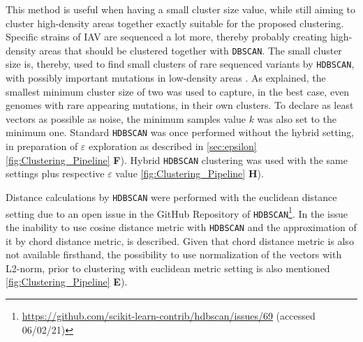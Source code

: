 \vspace{1em}

This method is useful when having a small cluster size value, while still aiming to cluster high-density areas together exactly suitable for the proposed clustering. Specific strains of \gls{IAV} are sequenced a lot more, thereby probably creating high-density areas that should be clustered together with \texttt{DBSCAN}. The small cluster size is, thereby, used to find small clusters of rare sequenced variants by \texttt{HDBSCAN}, with possibly important mutations in low-density areas \autocite{malzer_hybrid_2020}. As explained, the smallest minimum cluster size of two was used to capture, in the best case, even genomes with rare appearing mutations, in their own clusters. To declare as least vectors as possible as noise, the minimum samples value $k$ was also set to the minimum one. Standard \texttt{HDBSCAN} was once performed without the hybrid setting, in preparation of $\varepsilon$ exploration as described in \autoref{sec:epsilon} \autoref{fig:Clustering_Pipeline} \textsf{\textbf{F}}). Hybrid \texttt{HDBSCAN} clustering was used with the same settings plus respective $\varepsilon$ value \autoref{fig:Clustering_Pipeline} \textsf{\textbf{H}}).

\vspace{1em}

Distance calculations by \texttt{HDBSCAN} were performed with the euclidean distance setting due to an open issue in the GitHub Repository of \texttt{HDBSCAN}\footnote{\url{https://github.com/scikit-learn-contrib/hdbscan/issues/69} (accessed 06/02/21)}. In the issue the inability to use cosine distance metric with \texttt{HDBSCAN} and the approximation of it by chord distance metric, is described. Given that chord distance metric is also not available firsthand, the possibility to use normalization of the vectors with L2-norm, prior to clustering with euclidean metric setting is also mentioned \autoref{fig:Clustering_Pipeline} \textsf{\textbf{E}}). 

